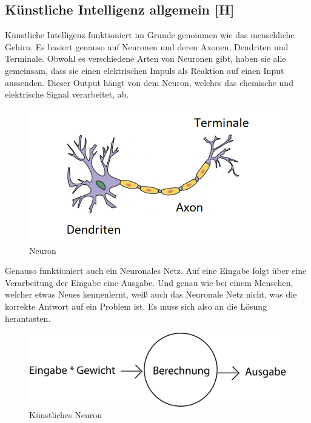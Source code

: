 \subsection{Künstliche Intelligenz allgemein [H]}\label{tech:ki:head}
Künstliche Intelligenz funktioniert im Grunde genommen wie das menschliche Gehirn. Es basiert genauso auf Neuronen und deren Axonen, Dendriten und Terminale. Obwohl es verschiedene Arten von Neuronen gibt, haben sie alle gemeinsam, dass sie einen elektrischen Impuls als Reaktion auf einen Input aussenden. Dieser Output hängt von dem Neuron, welches das chemische und elektrische Signal verarbeitet, ab.

\begin{figure}[H]
    \centering
    \includegraphics[scale=1]{pics/Neuron.png}
    \caption{Neuron \cite{tech:neuron:cite}}
    \label{fig:tech:Neuron}
\end{figure}

Genauso funktioniert auch ein Neuronales Netz. Auf eine Eingabe folgt über eine Verarbeitung der Eingabe eine Ausgabe. Und genau wie bei einem Menschen, welcher etwas Neues kennenlernt, weiß auch das Neuronale Netz nicht, was die korrekte Antwort auf ein Problem ist. Es muss sich also an die Lösung herantasten.

\begin{figure}[H]
    \centering
    \includegraphics[scale=0.3]{pics/eba.png}
    \caption{Künstliches Neuron}
    \label{fig:tech:eba}
\end{figure}

